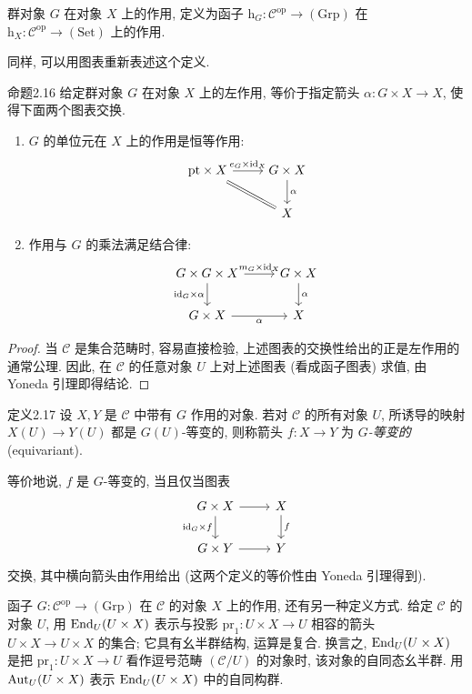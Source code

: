 群对象 $G$ 在对象 $X$ 上的作用, 定义为函子 $\mathrm h_G:\mathcal C^{\mathrm{op}}\to(\mathrm{Grp})$ 在 $\mathrm h_X:\mathcal C^{\mathrm{op}}\to(\mathrm{Set})$ 上的作用.

同样, 可以用图表重新表述这个定义.

\begin{origstatement}{命题}{2.16}\label{ch02:prop216}
给定群对象 $G$ 在对象 $X$ 上的左作用, 等价于指定箭头 $\alpha:G\times X\to X$, 使得下面两个图表交换.
\begin{enumerate}
\item[(i)] $G$ 的单位元在 $X$ 上的作用是恒等作用:
\[
\begin{tikzcd}
\mathrm{pt}\times X\arrow[r,"e_G\times\mathrm{id}_X"]\arrow[dr,equal]&G\times X\arrow[d,"\alpha"]\\&X
\end{tikzcd}
\]
\item[(ii)] 作用与 $G$ 的乘法满足结合律:
\[
\begin{tikzcd}
G\times G\times X\arrow[r,"m_G\times\mathrm{id}_X"]\arrow[d,"\mathrm{id}_G\times\alpha"']&G\times X\arrow[d,"\alpha"]\\
G\times X\arrow[r,"\alpha"']&X
\end{tikzcd}
\]
\end{enumerate}
\end{origstatement}
\begin{proof}
当 $\mathcal C$ 是集合范畴时, 容易直接检验, 上述图表的交换性给出的正是左作用的通常公理. 因此, 在 $\mathcal C$ 的任意对象 $U$ 上对上述图表 (看成函子图表) 求值, 由 Yoneda 引理即得结论.
\end{proof}

\begin{origstatement}{定义}{2.17}\label{ch02:def217}
设 $X,Y$ 是 $\mathcal C$ 中带有 $G$ 作用的对象. 若对 $\mathcal C$ 的所有对象 $U$, 所诱导的映射 $X(U)\to Y(U)$ 都是 $G(U)$-等变的, 则称箭头 $f:X\to Y$ 为 \emph{$G$-等变的} (equivariant).
\end{origstatement}

等价地说, $f$ 是 $G$-等变的, 当且仅当图表
\[
\begin{tikzcd}
G\times X\arrow[r]\arrow[d,"\mathrm{id}_G\times f"']&X\arrow[d,"f"]\\
G\times Y\arrow[r]&Y
\end{tikzcd}
\]
交换, 其中横向箭头由作用给出 (这两个定义的等价性由 Yoneda 引理得到).

函子 $G:\mathcal C^{\mathrm{op}}\to(\mathrm{Grp})$ 在 $\mathcal C$ 的对象 $X$ 上的作用, 还有另一种定义方式. 给定 $\mathcal C$ 的对象 $U$, 用 $\operatorname{End}_U(U\times X)$ 表示与投影 $\mathrm{pr}_1:U\times X\to U$ 相容的箭头 $U\times X\to U\times X$ 的集合; 它具有幺半群结构, 运算是复合. 换言之, $\operatorname{End}_U(U\times X)$ 是把 $\mathrm{pr}_1:U\times X\to U$ 看作逗号范畴 $(\mathcal C/U)$ 的对象时, 该对象的自同态幺半群. 用 $\operatorname{Aut}_U(U\times X)$ 表示 $\operatorname{End}_U(U\times X)$ 中的自同构群.

